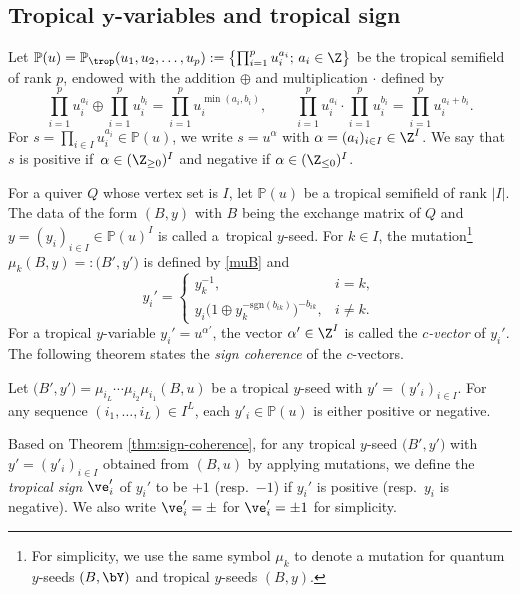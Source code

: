 \subsection[Tropical y-variables and tropical sign]{Tropical $\boldsymbol{y}$-variables and tropical sign}

Let $\mathbb{P}(u)=\mathbb{P}_\trop(u_1,u_2,\dotsc,u_p) := \bigl\{\prod_{i=1}^{p} u_i^{a_i};\, a_i \in \Z \bigr\}$
be the tropical semifield of rank $p$, endowed with the addition $\oplus$ and multiplication $\cdot$ defined by
\[
 \prod_{i=1}^{p} u_i^{a_i} \oplus \prod_{i=1}^{p} u_i^{b_i}
 =
 \prod_{i=1}^{p} u_i^{\min(a_i,b_i)},
 \qquad
 \prod_{i=1}^{p} u_i^{a_i} \cdot \prod_{i=1}^{p} u_i^{b_i}
 =
 \prod_{i=1}^{p} u_i^{a_i+b_i}.
\]
For $s = \prod_{i \in I} u_i^{a_i} \in \mathbb{P}(u)$, we write $s = u^\alpha$
with $\alpha = (a_i)_{i \in I} \in \Z^{I}$.
We say that $s$ is positive if~${\alpha \in (\Z_{\geq 0})^{I}}$ and negative if
$\alpha \in (\Z_{\leq 0})^{I}$.

For a quiver $Q$ whose vertex set is $I$, let $\mathbb{P}(u)$ be a tropical semifield of rank $|I|$.
The data of the form $(B,y)$ with $B$ being the exchange matrix of $Q$ and
$y = (y_i)_{i \in I} \in \mathbb{P}(u)^{I}$ is called a~tropical $y$-seed.
For $k \in I$, the mutation\footnote{For simplicity, we use the same symbol $\mu_k$ to denote a mutation for
quantum $y$-seeds $(B,\bY)$ and tropical $y$-seeds $(B,y)$.}
 $\mu_k (B, y) =: \bigl(B', y'\bigr)$ is defined by
\eqref{muB} and
\begin{equation}\label{tmu}
y_{i}' =
 \begin{cases}
 y_k^{-1}, & i=k,
 \\
 y_i \bigl(1 \oplus y_k^{-\mathrm{sgn}(b_{ik})}\bigr)^{-b_{ik}}, & i \neq k.
 \end{cases}
\end{equation}
For a tropical $y$-variable $y_i' = u^{\alpha'}$, the vector $\alpha' \in \Z^I$
is called the {\it $c$-vector} of $y_i'$.
The following theorem states the {\em sign coherence} of the $c$-vectors.

\begin{Theorem}
\label{thm:sign-coherence}
Let $\bigl(B',y'\bigr) = \mu_{i_L} \dotsm \mu_{i_2} \mu_{i_1}(B,u)$ be a
tropical $y$-seed with $y'=(y'_i)_{i \in I}$. For any sequence
$(i_1,\dotsc, i_L) \in I^L$, each $y'_i \in \mathbb{P}(u)$ is either
positive or negative.
\end{Theorem}

Based on Theorem \ref{thm:sign-coherence}, for any tropical $y$-seed $\bigl(B',y'\bigr)$ with
$y'=(y'_i)_{i \in I}$ obtained from $(B,u)$ by applying mutations, we
define the {\it tropical sign} $\ve_i'$ of $y_i'$ to be $+1$ (resp.\
$-1$) if $y_i'$ is positive (resp.\ $y_i$ is negative). We also write
$\ve_i'= \pm$ for $\ve_i'=\pm 1$ for simplicity.


